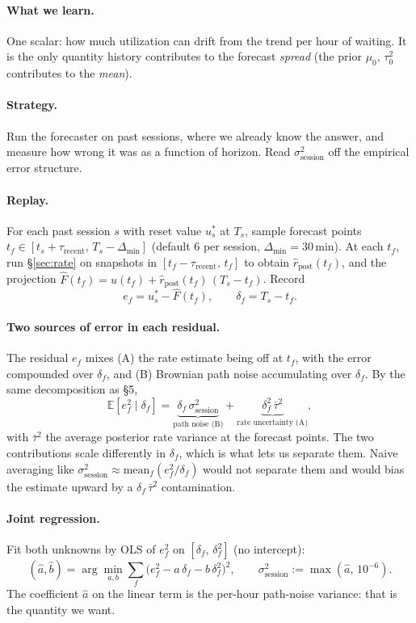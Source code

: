\documentclass[11pt]{article}
\newcommand{\rpost}{\hat r_{\text{post}}}
\newcommand{\tauzerosq}{\tau_0^2}
\newcommand{\sigsessionsq}{\sigma_{\text{session}}^2}
\newcommand{\taurecent}{\tau_{\text{recent}}}
\begin{document}
\paragraph{What we learn.} One scalar: how much utilization can drift from
the trend per hour of waiting. It is the only quantity history contributes
to the forecast \emph{spread} (the prior $\mu_0,\,\tauzerosq$ contributes to
the \emph{mean}).

\paragraph{Strategy.} Run the forecaster on past sessions, where we already
know the answer, and measure how wrong it was as a function of horizon.
Read $\sigsessionsq$ off the empirical error structure.

\paragraph{Replay.} For each past session $s$ with reset value $u_s^\ast$ at
$T_s$, sample forecast points $t_f \in [t_s + \taurecent,\, T_s -
\Delta_{\min}]$ (default 6 per session, $\Delta_{\min} = 30$\,min). At each
$t_f$, run \S\ref{sec:rate} on snapshots in $[t_f - \taurecent,\, t_f]$ to
obtain $\rpost(t_f)$, and the projection $\hat F(t_f) = u(t_f) +
\rpost(t_f)\,(T_s - t_f)$. Record
\[
  e_f = u_s^\ast - \hat F(t_f),
  \qquad
  \delta_f = T_s - t_f.
\]

\paragraph{Two sources of error in each residual.} The residual $e_f$ mixes
(A) the rate estimate being off at $t_f$, with the error compounded over
$\delta_f$, and (B) Brownian path noise accumulating over $\delta_f$. By the
same decomposition as \S5,
\[
  \mathbb{E}[e_f^2 \mid \delta_f]
  = \underbrace{\delta_f\,\sigsessionsq}_{\text{path noise (B)}}
  + \underbrace{\delta_f^2\,\bar\tau^2}_{\text{rate uncertainty (A)}},
\]
with $\bar\tau^2$ the average posterior rate variance at the forecast
points. The two contributions scale differently in $\delta_f$, which is what
lets us separate them. Naive averaging like $\sigsessionsq \approx
\mathrm{mean}_f(e_f^2 / \delta_f)$ would not separate them and would bias
the estimate upward by a $\delta_f\,\bar\tau^2$ contamination.

\paragraph{Joint regression.} Fit both unknowns by OLS of $e_f^2$ on
$[\delta_f,\, \delta_f^2]$ (no intercept):
\[
  (\hat a, \hat b)
    = \arg\min_{a, b} \sum_f \bigl(e_f^2 - a\,\delta_f - b\,\delta_f^2\bigr)^2,
  \qquad
  \sigsessionsq := \max(\hat a,\, 10^{-6}).
\]
The coefficient $\hat a$ on the linear term is the per-hour path-noise
variance: that is the quantity we want.
\end{document}
